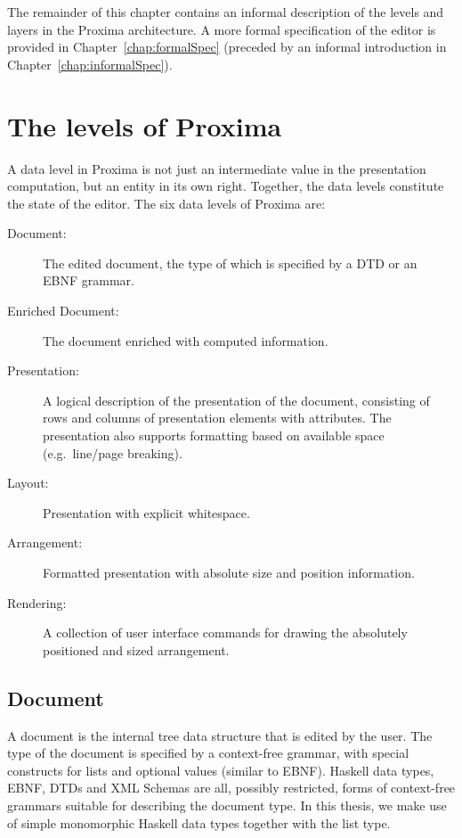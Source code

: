 The remainder of this chapter contains an informal description of the levels and layers in the Proxima architecture. A more formal specification of the editor is provided in Chapter~\ref{chap:formalSpec} (preceded by an informal introduction in Chapter~\ref{chap:informalSpec}).


%																
%																
%																
\section{The levels of Proxima}

A data level in Proxima is not just an intermediate value in the presentation computation, but an entity in its own right. Together, the data levels constitute the state of the editor. The six data levels of Proxima are:

\begin{description}
\item[Document:] The edited document, the type of which is specified by a DTD or an EBNF grammar.

\item[Enriched Document:] The document enriched with computed information.

\item[Presentation:] A logical description of the presentation of the document, consisting of rows and columns of presentation elements with attributes. The presentation also supports formatting based on available space (e.g.\ line/page breaking).

\item[Layout:]  Presentation with explicit whitespace.

\item[Arrangement:] Formatted presentation with absolute size and position information.

\item[Rendering:] A collection of user interface commands for drawing the absolutely positioned and sized arrangement.
\end{description}


%																
\subsection{Document} \label {sect:docLevel}

A document is the internal tree data structure that is edited by the user. The type of the document is specified by a context-free grammar, with special constructs for lists and optional values (similar to EBNF). Haskell data types, EBNF, DTDs and XML Schemas are all, possibly restricted, forms of context-free grammars suitable for describing the document type. In this thesis, we make use of simple monomorphic Haskell data types together with the list type.

